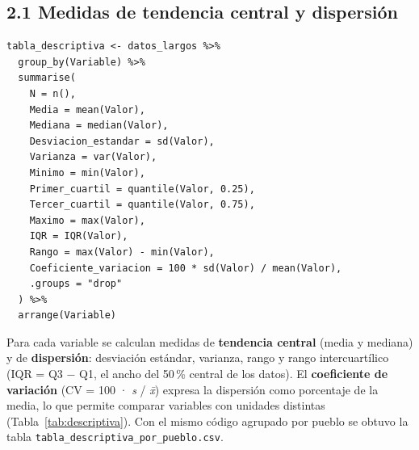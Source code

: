 \documentclass[10pt,letterpaper,twocolumn]{article}
\newcommand{\var}[1]{\texttt{#1}}
\begin{document}
\subsection{2.1 Medidas de tendencia central y dispersión}

\begin{lstlisting}[firstnumber=180]
tabla_descriptiva <- datos_largos %>%
  group_by(Variable) %>%
  summarise(
    N = n(),
    Media = mean(Valor),
    Mediana = median(Valor),
    Desviacion_estandar = sd(Valor),
    Varianza = var(Valor),
    Minimo = min(Valor),
    Primer_cuartil = quantile(Valor, 0.25),
    Tercer_cuartil = quantile(Valor, 0.75),
    Maximo = max(Valor),
    IQR = IQR(Valor),
    Rango = max(Valor) - min(Valor),
    Coeficiente_variacion = 100 * sd(Valor) / mean(Valor),
    .groups = "drop"
  ) %>%
  arrange(Variable)
\end{lstlisting}

Para cada variable se calculan medidas de \textbf{tendencia central} (media y mediana) y de \textbf{dispersión}: desviación estándar, varianza, rango y rango intercuartílico (IQR = Q3 − Q1, el ancho del 50\,\% central de los datos). El \textbf{coeficiente de variación} (CV = 100 · \textit{s} / \textit{x̄}) expresa la dispersión como porcentaje de la media, lo que permite comparar variables con unidades distintas (Tabla~\ref{tab:descriptiva}). Con el mismo código agrupado por pueblo se obtuvo la tabla \var{tabla\_descriptiva\_por\_pueblo.csv}.
\end{document}
